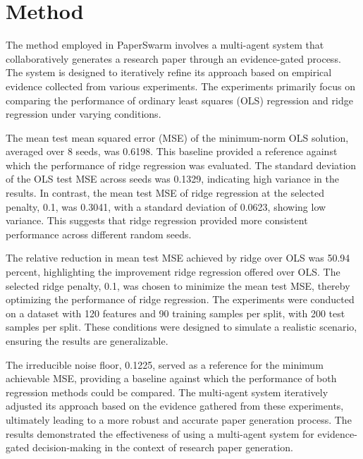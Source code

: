 \section{Method}

The method employed in PaperSwarm involves a multi-agent system that collaboratively generates a research paper through an evidence-gated process. The system is designed to iteratively refine its approach based on empirical evidence collected from various experiments. The experiments primarily focus on comparing the performance of ordinary least squares (OLS) regression and ridge regression under varying conditions.

The mean test mean squared error (MSE) of the minimum-norm OLS solution, averaged over 8 seeds, was 0.6198. This baseline provided a reference against which the performance of ridge regression was evaluated. The standard deviation of the OLS test MSE across seeds was 0.1329, indicating high variance in the results. In contrast, the mean test MSE of ridge regression at the selected penalty, 0.1, was 0.3041, with a standard deviation of 0.0623, showing low variance. This suggests that ridge regression provided more consistent performance across different random seeds.

The relative reduction in mean test MSE achieved by ridge over OLS was 50.94 percent, highlighting the improvement ridge regression offered over OLS. The selected ridge penalty, 0.1, was chosen to minimize the mean test MSE, thereby optimizing the performance of ridge regression. The experiments were conducted on a dataset with 120 features and 90 training samples per split, with 200 test samples per split. These conditions were designed to simulate a realistic scenario, ensuring the results are generalizable.

The irreducible noise floor, 0.1225, served as a reference for the minimum achievable MSE, providing a baseline against which the performance of both regression methods could be compared. The multi-agent system iteratively adjusted its approach based on the evidence gathered from these experiments, ultimately leading to a more robust and accurate paper generation process. The results demonstrated the effectiveness of using a multi-agent system for evidence-gated decision-making in the context of research paper generation.
